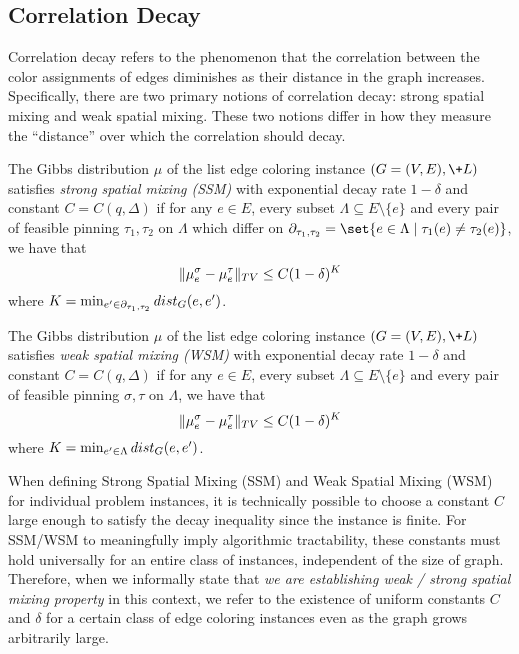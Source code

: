 \documentclass[a4paper,11pt]{article}
\begin{document}
\subsection{Correlation Decay}\label{sec:prelim-decay}
Correlation decay refers to the phenomenon that the correlation between the color assignments of edges diminishes as their distance in the graph increases. Specifically, there are two primary notions of correlation decay: strong spatial mixing and weak spatial mixing. These two notions differ in how they measure the ``distance'' over which the correlation should decay.
\begin{definition}\label{def:SSM}
    The Gibbs distribution $\mu$ of the list edge coloring instance $(G = (V,E), \+L)$ satisfies \textit{strong spatial mixing (SSM)} with exponential decay rate $1 - \delta$ and constant $C = C(q,\Delta)$ if for any $e \in E$, every subset $\Lambda \subseteq E\setminus \{e\}$ and every pair of feasible pinning $\tau_1,\tau_2$ on $\Lambda$ which differ on $\partial_{\tau_1,\tau_2} = \set{e\in \Lambda\mid \tau_1(e)\neq \tau_2(e)}$, we have that
    $$
        \|\mu_{e}^\sigma - \mu_e^\tau\|_{\-{TV}} \leq C(1 - \delta)^K
    $$
    where $K = \min_{e'\in \partial_{\tau_1,\tau_2}}\-{dist}_{G}(e,e')$.
\end{definition}
\begin{definition}\label{def:WSM}
    The Gibbs distribution $\mu$ of the list edge coloring instance $(G = (V,E), \+L)$ satisfies \textit{weak spatial mixing (WSM)} with exponential decay rate $1 - \delta$ and constant $C = C(q,\Delta)$ if for any $e \in E$, every subset $\Lambda \subseteq E\setminus \{e\}$ and every pair of feasible pinning $\sigma,\tau$ on $\Lambda$, we have that
    $$
        \|\mu_{e}^\sigma - \mu_e^\tau\|_{\-{TV}} \leq C(1 - \delta)^K
    $$
    where $K = \min_{e'\in \Lambda}\-{dist}_{G}(e,e')$.
\end{definition}
\begin{remark}
    When defining Strong Spatial Mixing (SSM) and Weak Spatial Mixing (WSM) for individual problem instances, it is technically possible to choose a constant $C$ large enough to satisfy the decay inequality since the instance is finite. For SSM/WSM to meaningfully imply algorithmic tractability, these constants must hold universally for an entire class of instances, independent of the size of graph. Therefore, when we informally state that \emph{we are establishing weak / strong spatial mixing property} in this context, we refer to the existence of uniform constants $C$ and $\delta$ for a certain class of edge coloring instances even as the graph grows arbitrarily large.
\end{remark}
%
\end{document}
